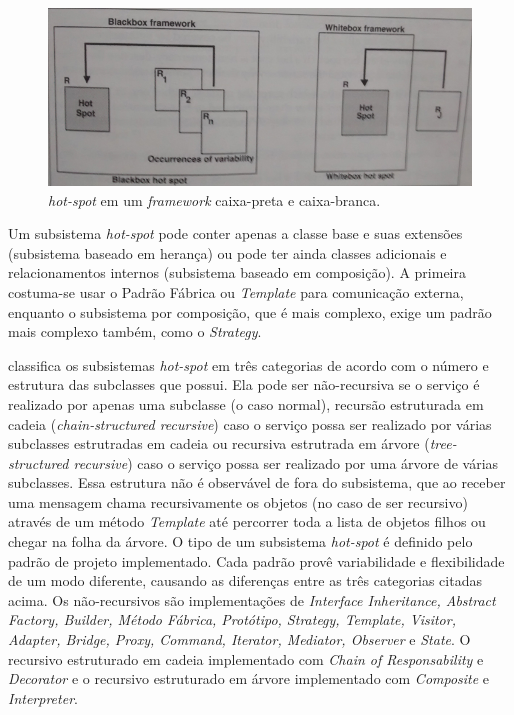 \begin{figure}[h]
	\centering
	\label{fig13}
		\includegraphics[keepaspectratio=true,scale=0.3]{figuras/hotspotbox.jpg}
	\caption{\textit{hot-spot} em um \textit{framework} caixa-preta e caixa-branca. \cite{Fayad1999}}
\end{figure}

Um subsistema \textit{hot-spot} pode conter apenas a classe base e suas extensões (subsistema baseado em herança) ou pode ter ainda classes adicionais e relacionamentos internos (subsistema baseado em composição). A primeira costuma-se usar o Padrão Fábrica ou \textit{Template} para comunicação externa, enquanto o subsistema por composição, que é mais complexo, exige um padrão mais complexo também, como o \textit{Strategy}.

\cite{Fayad1999} classifica os subsistemas \textit{hot-spot} em três categorias de acordo com o número e estrutura das subclasses que possui. Ela pode ser não-recursiva se o serviço é realizado por apenas uma subclasse (o caso normal), recursão estruturada em cadeia (\textit{chain-structured recursive}) caso o serviço possa ser realizado por várias subclasses estrutradas em cadeia ou recursiva estrutrada em árvore (\textit{tree-structured recursive}) caso o serviço possa ser realizado por uma árvore de várias subclasses. Essa estrutura não é observável de fora do subsistema, que ao receber uma mensagem chama recursivamente os objetos (no caso de ser recursivo) através de um método \textit{Template} até percorrer toda a lista de objetos filhos ou chegar na folha da árvore. O tipo de um subsistema \textit{hot-spot} é definido pelo padrão de projeto implementado. Cada padrão provê variabilidade e flexibilidade de um modo diferente, causando as diferenças entre as três categorias citadas acima. Os não-recursivos são implementações de \textit{Interface Inheritance, Abstract Factory, Builder, Método Fábrica, Protótipo, Strategy, Template, Visitor, Adapter, Bridge, Proxy, Command, Iterator, Mediator, Observer} e \textit{State}. O recursivo estruturado em cadeia implementado com \textit{Chain of Responsability} e \textit{Decorator} e o recursivo estruturado em árvore implementado com \textit{Composite} e \textit{Interpreter}.

